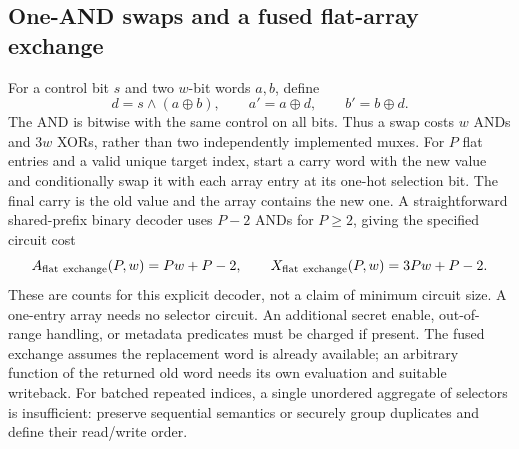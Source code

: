 \subsection{One-AND swaps and a fused flat-array exchange}
For a control bit $s$ and two $w$-bit words $a,b$, define
\begin{equation}
 d=s\mathbin{\wedge}(a\oplus b),\qquad
 a'=a\oplus d,\qquad b'=b\oplus d.
 \label{eq:one-and-swap}
\end{equation}
The AND is bitwise with the same control on all bits.  Thus a swap costs
$w$ ANDs and $3w$ XORs, rather than two independently implemented muxes.
For $P$ flat entries and a valid unique target index, start a carry word with
the new value and conditionally swap it with each array entry at its one-hot
selection bit.  The final carry is the old value and the array contains the
new one.  A straightforward shared-prefix binary decoder uses $P-2$ ANDs
for $P\ge2$, giving the specified circuit cost
\begin{equation}
 A_{\rm flat\ exchange}(P,w)=Pw+P-2,
 \qquad X_{\rm flat\ exchange}(P,w)=3Pw+P-2.
 \label{eq:flat-fused-exchange}
\end{equation}
These are counts for this explicit decoder, not a claim of minimum circuit
size.  A one-entry array needs no selector circuit.  An additional secret
enable, out-of-range handling, or metadata predicates must be charged if
present.  The fused exchange assumes the replacement word is already
available; an arbitrary function of the returned old word needs its own
evaluation and suitable writeback.  For batched repeated indices, a
single unordered aggregate of selectors is insufficient: preserve sequential
semantics or securely group duplicates and define their read/write order.
